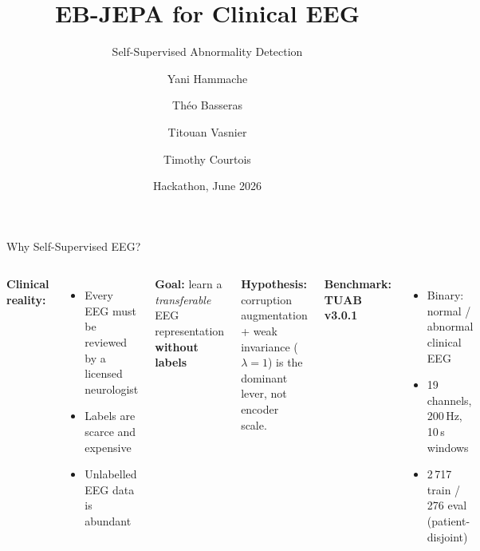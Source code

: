 \documentclass[aspectratio=169,10pt]{beamer}
\title{EB-JEPA for Clinical EEG}
\subtitle{Self-Supervised Abnormality Detection}
\author{Yani Hammache \and Théo Basseras \and Titouan Vasnier \and Timothy Courtois}
\date{Hackathon, June 2026}
\begin{document}
\maketitle

\begin{frame}{Why Self-Supervised EEG?}
\begin{columns}[T]
\textbf{Clinical reality:}
\begin{itemize}\setlength\itemsep{0pt}
  \item Every EEG must be reviewed by a licensed neurologist
  \item Labels are scarce and expensive
  \item Unlabelled EEG data is abundant
\end{itemize}

\vspace{0.3em}
\textbf{Goal:} learn a \emph{transferable} EEG representation \textbf{without labels}

\vspace{0.3em}
\textbf{Hypothesis:} corruption augmentation + weak invariance ($\lambda{=}1$) is the dominant lever, not encoder scale.

\vspace{0.3em}
\textbf{Benchmark: TUAB v3.0.1}
\begin{itemize}\setlength\itemsep{0pt}
  \item Binary: normal / abnormal clinical EEG
  \item 19 channels, 200\,Hz, 10\,s windows
  \item 2\,717 train / 276 eval (patient-disjoint)
\end{itemize}

\begin{center}
\end{center}
\end{columns}
\end{frame}
\end{document}
